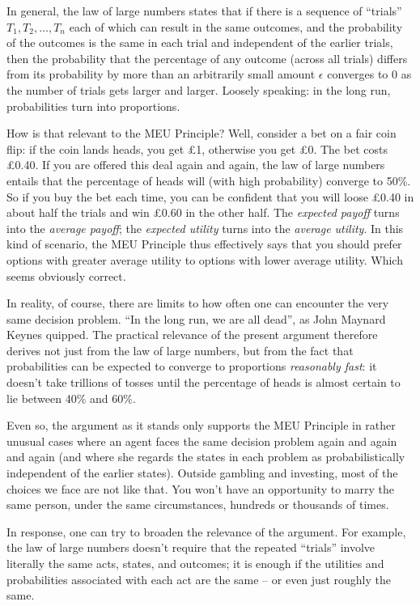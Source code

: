 In general, the law of large numbers states that if there is a sequence
of ``trials'' $T_1,T_2,\ldots,T_n$ each of which can result in the
same outcomes, and the probability of the outcomes is the same in each
trial and independent of the earlier trials, then the probability that
the percentage of any outcome (across all trials) differs from its
probability by more than an arbitrarily small amount $\epsilon$
converges to 0 as the number of trials gets larger and larger. Loosely
speaking: in the long run, probabilities turn into proportions.

How is that relevant to the MEU Principle? Well, consider a bet on a
fair coin flip: if the coin lands heads, you get £1, otherwise you get
£0. The bet costs £0.40. If you are offered this deal again and again,
the law of large numbers entails that the percentage of heads will
(with high probability) converge to 50\%. So if you buy the bet each
time, you can be confident that you will loose £0.40 in about half the
trials and win £0.60 in the other half. The \emph{expected payoff}
turns into the \emph{average payoff}; the \emph{expected utility}
turns into the \emph{average utility}. In this kind of scenario, the
MEU Principle thus effectively says that you should prefer options
with greater average utility to options with lower average
utility. Which seems obviously correct.

In reality, of course, there are limits to how often one can encounter
the very same decision problem. ``In the long run, we are all dead'',
as John Maynard Keynes quipped. The practical relevance of the present
argument therefore derives not just from the law of large numbers, but
from the fact that probabilities can be expected to converge to
proportions \emph{reasonably fast}: it doesn't take trillions of
tosses until the percentage of heads is almost certain to lie between
40\% and 60\%.

Even so, the argument as it stands only supports the MEU Principle in
rather unusual cases where an agent faces the same decision problem
again and again and again (and where she regards the states in each
problem as probabilistically independent of the earlier
states). Outside gambling and investing, most of the choices we face
are not like that. You won't have an opportunity to marry the same
person, under the same circumstances, hundreds or thousands of times.

In response, one can try to broaden the relevance of the argument. For
example, the law of large numbers doesn't require that the repeated
``trials'' involve literally the same acts, states, and outcomes; it
is enough if the utilities and probabilities associated with each act
are the same -- or even just roughly the same.

